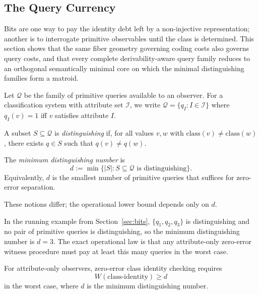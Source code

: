 \subsection{The Query Currency}

Bits are one way to pay the identity debt left by a non-injective representation; another is to interrogate primitive observables until the class is determined. This section shows that the same fiber geometry governing coding costs also governs query costs, and that every complete derivability-aware query family reduces to an orthogonal semantically minimal core on which the minimal distinguishing families form a matroid.

\begin{definition}
Let $\mathcal Q$ be the family of primitive queries available to an observer. For a classification system with attribute set $\mathcal I$, we write $\mathcal Q = \{q_I : I \in \mathcal I\}$ where $q_I(v)=1$ iff $v$ satisfies attribute $I$.
\end{definition}

\begin{definition}
A subset $S \subseteq \mathcal Q$ is \emph{distinguishing} if, for all values $v,w$ with $\mathrm{class}(v) \ne \mathrm{class}(w)$, there exists $q \in S$ such that $q(v) \ne q(w)$.
\end{definition}

\begin{definition}\label{def:distinguishing-dimension}
The \emph{minimum distinguishing number} is
\[
d := \min\{|S| : S \subseteq \mathcal Q \text{ is distinguishing}\}.
\]
Equivalently, $d$ is the smallest number of primitive queries that suffices for zero-error separation.
\end{definition}

\begin{remark}
These notions differ; the operational lower bound depends only on $d$.
\end{remark}

In the running example from Section~\ref{sec:bits}, $\{q_1,q_2,q_3\}$ is distinguishing and no pair of primitive queries is distinguishing, so the minimum distinguishing number is $d=3$. The exact operational law is that any attribute-only zero-error witness procedure must pay at least this many queries in the worst case.

\begin{theorem}\label{thm:interface-lower-bound}
For attribute-only observers, zero-error class identity checking requires
\[
W(\text{class-identity}) \ge d
\]
in the worst case, where $d$ is the minimum distinguishing number.
\end{theorem}

